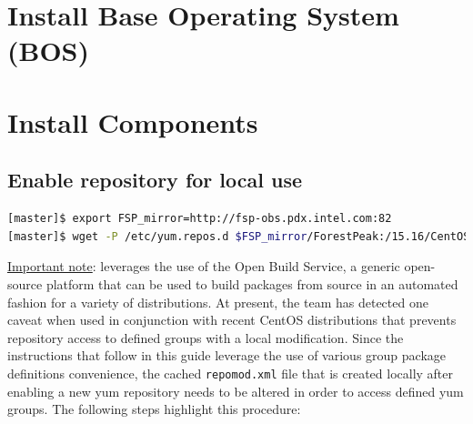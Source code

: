 \documentclass[letterpaper]{article}
\begin{document}






\section{Install Base Operating System (BOS)}



\section{Install \FSP{} Components} \label{sec:basic_install}


\subsection{Enable \FSP{} repository for local use} \label{sec:enable_repo}


\begin{lstlisting}[language=bash,keywords={}]
[master]$ export FSP_mirror=http://fsp-obs.pdx.intel.com:82
[master]$ wget -P /etc/yum.repos.d $FSP_mirror/ForestPeak:/15.16/CentOS-7.1_Intel/ForestPeak:15.16.repo
\end{lstlisting}


\underline {Important note}: \FSP{} leverages the use of the Open Build
Service, a generic open-source platform that can be used to build packages from
source in an automated fashion for a variety of \Linux{} distributions. At
present, the \FSP{} team has detected one caveat when used in conjunction with
recent CentOS distributions that prevents repository access to defined groups
with a local modification. Since the instructions that follow in this guide
leverage the use of various group package definitions convenience, the cached
\texttt{repomod.xml} file that is created locally after enabling a new yum
repository needs to be altered in order to access defined yum groups. The
following steps highlight this procedure:
\end{document}
